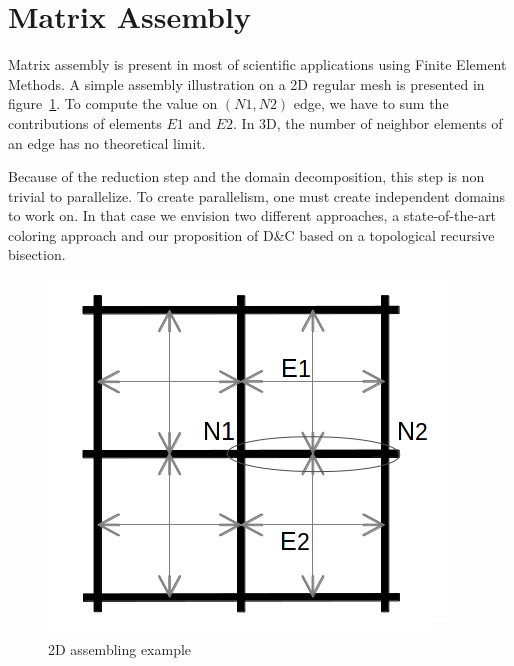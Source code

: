 \documentclass{IOS-Book-Article}
\begin{document}
\section{Matrix Assembly}

Matrix assembly is present in most of scientific applications using Finite Element Methods.
A simple assembly illustration on a 2D regular mesh is presented in figure~\ref{fig:2Dasm}.
To compute the value on $(N1,N2)$ edge, we have to sum the contributions of elements $E1$ and $E2$.
In 3D, the number of neighbor elements of an edge has no theoretical limit.

Because of the reduction step and the domain decomposition, this step is non trivial to parallelize.
To create parallelism, one must create independent domains to work on.
In that case we envision two different approaches, a state-of-the-art coloring approach and our proposition of D\&C based on a topological recursive bisection.
\begin{figure}[htp]
 \centering
 \includegraphics[scale=0.2]{2D_asm.png}
 \caption{2D assembling example}
 \label{fig:2Dasm}
\end{figure}
\end{document}
